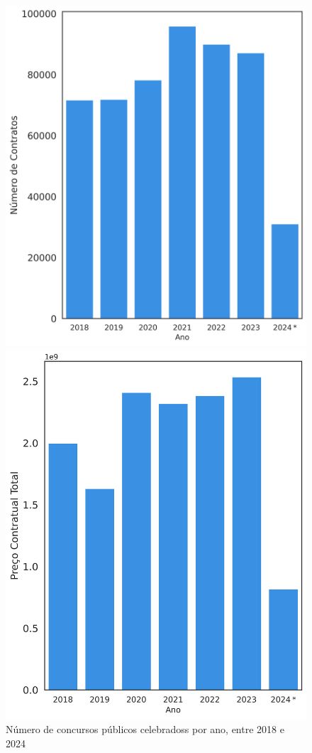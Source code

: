 \begin{figure}[H]
\begin{minipage}{0.31\linewidth}
		\includegraphics[width=\linewidth]{imagens/adir_nrcontr.png}
		\caption{Número de concursos públicos celebradoss por ano, entre 2018 e 2024}
		\label{fig:precoad1}
	\end{minipage}
	\hfill
	\begin{minipage}{.31\linewidth}
		\includegraphics[width=\linewidth]{imagens/adir_price.png}

\end{minipage}
\end{figure}
